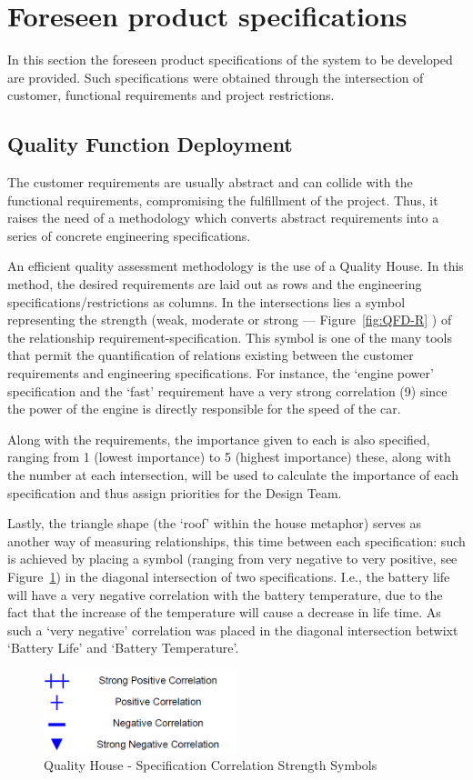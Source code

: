 \section{Foreseen product specifications}%
\label{sec:org31f7574}
In this section the foreseen product specifications of the system to be developed are provided. Such specifications were obtained through the intersection of customer, functional requirements and project restrictions.
\subsection{Quality Function Deployment}%
\label{sec:qfd}
The customer requirements are usually abstract and can collide with the functional requirements, compromising the fulfillment of the project. Thus, it raises the need of a methodology which converts abstract requirements into a series of concrete engineering specifications.

An efficient quality assessment methodology is the use of a Quality House. In this method, the desired requirements are laid out as rows and the engineering specifications/restrictions as columns. In the intersections lies a symbol representing the strength (weak, moderate or strong --- Figure~\ref{fig:QFD-R} ) of the relationship requirement-specification. This symbol is one of the many tools that permit the quantification of relations existing between the customer requirements and engineering specifications.
For instance, the `engine power' specification and the `fast' requirement have a
very strong correlation (9) since the power of the engine is directly
responsible for the speed of the car.

Along with the requirements, the importance given to each is also specified, ranging from 1 (lowest importance) to 5 (highest importance) these, along with the number at each intersection, will be used to calculate the importance of each specification and thus assign priorities for the Design Team.

Lastly, the triangle shape (the `roof' within the house metaphor) serves as another way of measuring relationships, this time between each specification: such is achieved by placing a symbol (ranging from very negative to very positive, see Figure~\ref{fig:QFD-Roof}) in the diagonal intersection of two specifications. 
I.e., the battery life will have a very negative correlation with the battery temperature, due to the fact that the increase of the temperature will cause a decrease in life time. As such a `very negative' correlation was placed in the diagonal intersection betwixt `Battery Life' and `Battery Temperature'. 
\begin{figure}[!htbp]
   \centering
       \includegraphics[page=1,width=0.5\textwidth]{sec/img/Roof_Symbols.png} 
 \caption{Quality House - Specification Correlation Strength Symbols}%
\label{fig:QFD-Roof}
\end{figure}

